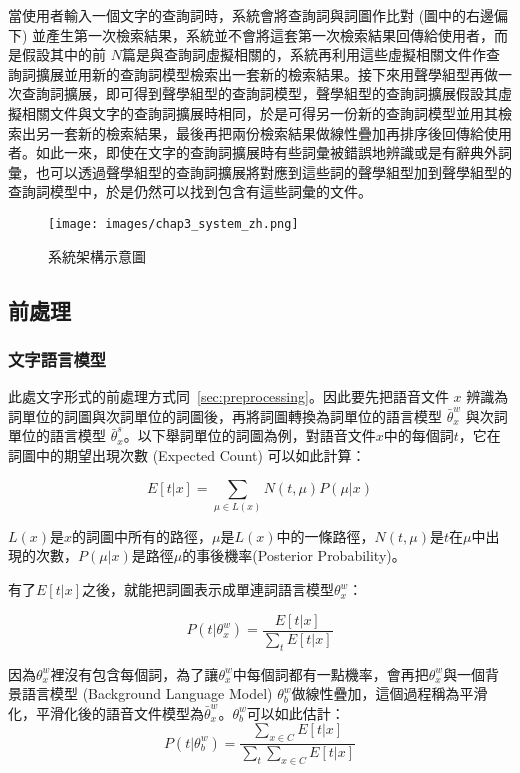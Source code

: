 當使用者輸入一個文字的查詢詞時，系統會將查詢詞與詞圖作比對 (圖中的右邊偏下) 並產生第一次檢索結果，系統並不會將這套第一次檢索結果回傳給使用者，而是假設其中的前
$N$篇是與查詢詞虛擬相關的，系統再利用這些虛擬相關文件作查詢詞擴展並用新的查詢詞模型檢索出一套新的檢索結果。接下來用聲學組型再做一次查詢詞擴展，即可得到聲學組型的查詢詞模型，聲學組型的查詢詞擴展假設其虛擬相關文件與文字的查詢詞擴展時相同，於是可得另一份新的查詢詞模型並用其檢索出另一套新的檢索結果，最後再把兩份檢索結果做線性疊加再排序後回傳給使用者。如此一來，即使在文字的查詢詞擴展時有些詞彙被錯誤地辨識或是有辭典外詞彙，也可以透過聲學組型的查詢詞擴展將對應到這些詞的聲學組型加到聲學組型的查詢詞模型中，於是仍然可以找到包含有這些詞彙的文件。

\begin{figure}
\centering
\texttt{[image: images/chap3\_system\_zh.png]}
\caption{系統架構示意圖} \label{fig:chap3_system}
\end{figure}

\subsection{前處理}
\subsubsection{文字語言模型}
此處文字形式的前處理方式同~\ref{sec:preprocessing}。因此要先把語音文件 $x$ 辨識為詞單位的詞圖與次詞單位的詞圖後，再將詞圖轉換為詞單位的語言模型 $\bar{\theta}_x^w$ 與次詞單位的語言模型 $\bar{\theta}_x^s$。以下舉詞單位的詞圖為例，對語音文件$x$中的每個詞$t$，它在詞圖中的期望出現次數 (Expected Count) 可以如此計算：

\begin{equation}
E[t|x] = \sum_{\mu \in L(x)} N(t, \mu)P(\mu|x)
\end{equation}

$L(x)$是$x$的詞圖中所有的路徑，$\mu$是$L(x)$中的一條路徑，$N(t, \mu)$是$t$在$\mu$中出現的次數，$P(\mu|x)$是路徑$\mu$的事後機率(Posterior Probability)。

有了$E[t|x]$之後，就能把詞圖表示成單連詞語言模型$\theta_x^w$：

\begin{equation}
P(t|\theta_x^w) = \frac{E[t|x]}{\sum_tE[t|x]}
\end{equation}

因為$\theta_x^w$裡沒有包含每個詞，為了讓$\theta_x^w$中每個詞都有一點機率，會再把$\theta_x^w$與一個背景語言模型 (Background Language Model) $\theta_b^w$做線性疊加，這個過程稱為平滑化，平滑化後的語音文件模型為$\bar{\theta}_x^w$。$\theta_b^w$可以如此估計：
\begin{equation}
P(t|\theta_b^w) = \frac{\sum_{x\in C}E[t|x]}{\sum_t\sum_{x\in C}E[t|x]}
\end{equation}

